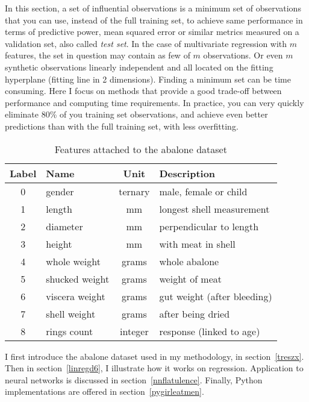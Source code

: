 \documentclass[oneside,10pt]{book}
\begin{document}
In this section, a set of influential observations is a minimum set of observations that you can use, instead of the full training set, to
 achieve same performance in terms of predictive power, mean squared error or similar metrics measured on a 
\textcolor{index}{validation set}, also called {\em test set}. In the case of multivariate regression with $m$ features,
 the set in question may contain as few of $m$ observations. Or even $m$ synthetic observations linearly independent and all located on the fitting hyperplane
 (fitting line in 2 dimensions). Finding a minimum set can be time consuming. Here I focus on methods that provide a good trade-off 
 between performance and computing time requirements. In practice, you can very quickly eliminate  80\% of you training set observations, and achieve even better predictions than with the full training set, with less overfitting.




\begin{table}[H]
\begin{center}
\begin{tabular}{|c|l|c|l|}
\hline
 Label &  Name & Unit	& Description\\
\hline
\hline
0 & gender & ternary & male, female or child \\
1 &  length & mm & longest shell measurement \\
2 &  diameter & mm & perpendicular to length \\
3 &  height & mm & with meat in shell \\
4 &  whole weight & grams & whole abalone \\
5 &  shucked weight & grams &  weight of meat \\
6 & viscera weight &  grams & gut weight (after bleeding) \\
7 & shell weight &  grams &  after being dried \\
8 & rings count & integer & response (linked to age) \\
\hline
\end{tabular}
\caption{\label{choctres} Features attached to the abalone dataset}
\end{center}
\end{table}

I first introduce the abalone dataset used in my methodology, in section~\ref{treszx}. Then in section~\ref{linregd6}, 
 I illustrate how it works on regression.  Application to neural networks is discussed in section~\ref{nnflatulence}. Finally, Python
 implementations are offered in section~\ref{pygirleatmen}.
\end{document}
